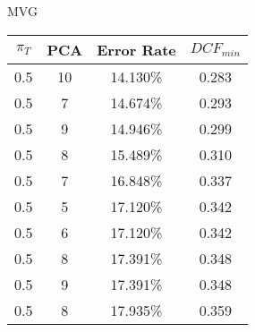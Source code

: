 \caption{MVG}\label{tab:mvg_acctable}
\begin{center}
\begin{tabular}{|c|c|c|c|}
    \hline
    $\pi_T$ & PCA & Error Rate & $DCF_{min}$\\
    \hline
    0.5 & 10 & 14.130\% & 0.283\\
    \hline
    0.5 & 7 & 14.674\% & 0.293\\
    \hline
    0.5 & 9 & 14.946\% & 0.299\\
    \hline
    0.5 & 8 & 15.489\% & 0.310\\
    \hline
    0.5 & 7 & 16.848\% & 0.337\\
    \hline
    0.5 & 5 & 17.120\% & 0.342\\
    \hline
    0.5 & 6 & 17.120\% & 0.342\\
    \hline
    0.5 & 8 & 17.391\% & 0.348\\
    \hline
    0.5 & 9 & 17.391\% & 0.348\\
    \hline
    0.5 & 8 & 17.935\% & 0.359\\
    \hline
\end{tabular}
\end{center}
